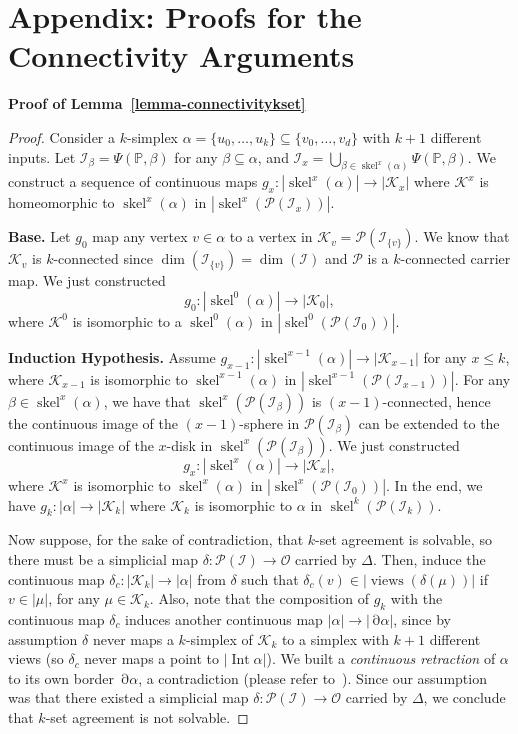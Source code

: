 \documentclass[11pt]{article}
\newcommand{\cI}{\ensuremath{\mathcal{I}}}
\newcommand{\cK}{\ensuremath{\mathcal{K}}}
\newcommand{\cO}{\ensuremath{\mathcal{O}}}
\newcommand{\cP}{\ensuremath{\mathcal{P}}}
\newcommand{\bbP}{\ensuremath{\mathbb{P}}}
\DeclareMathOperator{\Bd}{\partial}
\DeclareMathOperator{\inte}{Int}
\DeclareMathOperator{\skel}{skel}
\DeclareMathOperator{\views}{views}
\newcommand{\set}[1]{\{#1\}}
\begin{document}
\newpage

\appendix

\section{Appendix: Proofs for the Connectivity Arguments}
\label{App-ProofsConnectivity}

\noindent \textbf{Proof of Lemma~\ref{lemma-connectivitykset}}
\begin{proof}
Consider a $k$-simplex $\alpha = \set{u_0, \ldots, u_k} \subseteq \set{v_0, \ldots, v_d}$ with $k + 1$ different inputs.
Let $\cI_\beta = \Psi(\bbP, \beta)$ for any $\beta \subseteq \alpha$,
and $\cI_x = \bigcup_{\beta \in \skel^x(\alpha)} \Psi(\bbP, \beta)$.
We construct a sequence of continuous maps $g_x: |\skel^x(\alpha)| \to |\cK_x|$
where $\cK^x$ is homeomorphic to $\skel^x(\alpha)$ in $|\skel^x(\cP(\cI_x))|$.

\textbf{Base.} Let $g_0$ map any vertex $v \in \alpha$ to a vertex in $\cK_v = \cP(\cI_{\set{v}})$.
We know that $\cK_v$ is $k$-connected since $\dim(\cI_{\set{v}}) = \dim(\cI)$ and $\cP$ is a $k$-connected carrier map.
We just constructed
$$ g_0: |\skel^0(\alpha)| \to |\cK_0| \mathrm{,} $$
where $\cK^0$ is isomorphic to a $\skel^0(\alpha)$ in $|\skel^0(\cP(\cI_0))|$.

\textbf{Induction Hypothesis.} Assume $g_{x-1}: |\skel^{x-1}(\alpha)| \to |\cK_{x-1}|$ for any $x \le k$,
where $\cK_{x-1}$ is isomorphic to $\skel^{x-1}(\alpha)$ in $|\skel^{x-1}(\cP(\cI_{x-1}))|$. 
For any $\beta \in \skel^x(\alpha)$,
we have that $\skel^x(\cP(\cI_\beta))$ is $(x - 1)$-connected,
hence the continuous image of the $(x - 1)$-sphere in $\cP(\cI_\beta)$
can be extended to the continuous image of the $x$-disk in $\skel^x(\cP(\cI_\beta))$.
We just constructed
$$ g_x: |\skel^x(\alpha)| \to |\cK_x| \mathrm{,} $$
where $\cK^x$ is isomorphic to $\skel^x(\alpha)$ in $|\skel^x(\cP(\cI_0))|$.
In the end,
we have $g_k: |\alpha| \to |\cK_k|$ where $\cK_k$ is isomorphic to $\alpha$ in $\skel^k(\cP(\cI_k))$.

Now suppose,
for the sake of contradiction,
that $k$-set agreement is solvable,
so there must be a simplicial map $\delta: \cP(\cI) \to \cO$ carried by $\Delta$.
Then,
induce the continuous map $\delta_c: |\cK_k| \to |\alpha|$ from $\delta$ such that
$\delta_c(v) \in |\views(\delta(\mu))|$ if $v \in |\mu|$,
for any $\mu \in \cK_k$.
Also,
note that the composition of $g_k$ with the continuous map $\delta_c$
induces another continuous map $|\alpha| \to |\Bd\alpha|$,
since by assumption $\delta$ never maps a $k$-simplex of $\cK_k$ to a simplex with $k + 1$ different views
(so $\delta_c$ never maps a point to $|\inte{\alpha}|$).
We built a \emph{continuous retraction} of $\alpha$ to its own border $\Bd\alpha$,
a contradiction (please refer to~\cite{Munkres84,Kozlov07}).
Since our assumption was that there existed
a simplicial map $\delta: \cP(\cI) \to \cO$ carried by $\Delta$,
we conclude that $k$-set agreement is not solvable.
\end{proof}
\end{document}
